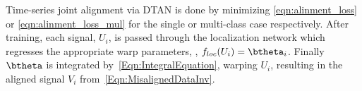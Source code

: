 Time-series joint alignment via DTAN is done by minimizing \EQN\eqref{eqn:alinment_loss} or \EQN\eqref{eqn:alinment_loss_mul} 
for the single or multi-class case respectively. After training, each signal, $U_i$, is passed through the localization network
 which regresses the appropriate warp parameters, \ie, $f_{loc}(U_i)=\btheta_i$. Finally $\btheta$ is integrated 
 by~\EQN\eqref{Eqn:IntegralEquation}, warping $U_i$, resulting in the aligned signal
  $V_i$ from~\EQN\eqref{Eqn:MisalignedDataInv}. 